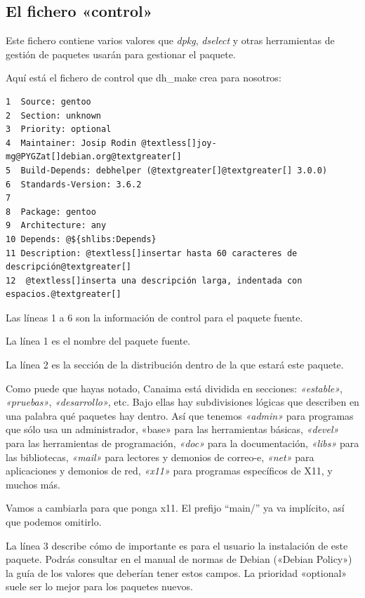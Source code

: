 \documentclass[letterpaper,12pt,spanish]{manual}
\begin{document}
\subsection{El fichero «control»}

Este fichero contiene varios valores que \emph{dpkg}, \emph{dselect} y otras herramientas de gestión de paquetes usarán para gestionar el paquete.

Aquí está el fichero de control que dh\_make crea para nosotros:

\begin{Verbatim}[commandchars=@\[\]]
1  Source: gentoo
2  Section: unknown
3  Priority: optional
4  Maintainer: Josip Rodin @textless[]joy-mg@PYGZat[]debian.org@textgreater[]
5  Build-Depends: debhelper (@textgreater[]@textgreater[] 3.0.0)
6  Standards-Version: 3.6.2
7
8  Package: gentoo
9  Architecture: any
10 Depends: @${shlibs:Depends}
11 Description: @textless[]insertar hasta 60 caracteres de descripción@textgreater[]
12  @textless[]inserta una descripción larga, indentada con espacios.@textgreater[]
\end{Verbatim}

Las líneas 1 a 6 son la información de control para el paquete fuente.

La línea 1 es el nombre del paquete fuente.

La línea 2 es la sección de la distribución dentro de la que estará este paquete.

Como puede que hayas notado, Canaima está dividida en secciones: \emph{«estable»}, \emph{«pruebas»}, \emph{«desarrollo»}, etc. Bajo ellas hay subdivisiones lógicas que describen en una palabra qué paquetes hay dentro. Así que tenemos \emph{«admin»} para programas que sólo usa un administrador, «base» para las herramientas básicas, \emph{«devel»} para las herramientas de programación, \emph{«doc»} para la documentación, \emph{«libs»} para las bibliotecas, \emph{«mail»} para lectores y demonios de correo-e, \emph{«net»} para aplicaciones y demonios de red, \emph{«x11»} para programas específicos de X11, y muchos más.

Vamos a cambiarla para que ponga x11. El prefijo ``main/'' ya va implícito, así que podemos omitirlo.

La línea 3 describe cómo de importante es para el usuario la instalación de este paquete. Podrás consultar en el manual de normas de Debian («Debian Policy») la guía de los valores que deberían tener estos campos. La prioridad «optional» suele ser lo mejor para los paquetes nuevos.
\end{document}
